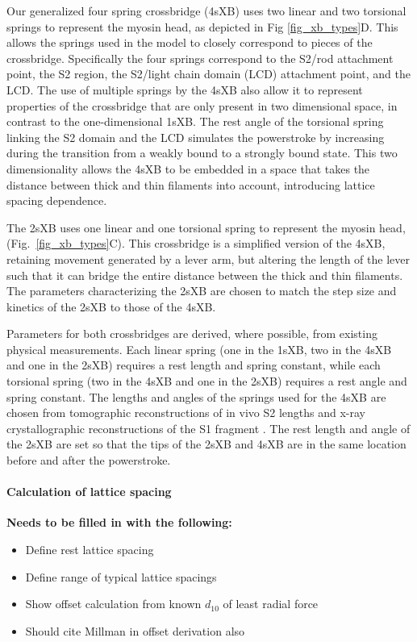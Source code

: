 \documentclass[]{article}
\begin{document}
Our generalized four spring crossbridge (4sXB) uses two linear and two torsional springs to represent the myosin head, as depicted in Fig \ref{fig_xb_types}D.
This allows the springs used in the model to closely correspond to pieces of the crossbridge.
Specifically the four springs correspond to the S2/rod attachment point, the S2 region, the S2/light chain domain (LCD) attachment point, and the LCD.
The use of multiple springs by the 4sXB also allow it to represent properties of the crossbridge that are only present in two dimensional space, in contrast to the one-dimensional 1sXB. 
The rest angle of the torsional spring linking the S2 domain and the LCD simulates the powerstroke by increasing during the transition from a weakly bound to a strongly bound state.
This two dimensionality allows the 4sXB to be embedded in a space that takes the distance between thick and thin filaments into account, introducing lattice spacing dependence.

The 2sXB uses one linear and one torsional spring to represent the myosin head, (Fig.~\ref{fig_xb_types}C).
This crossbridge is a simplified version of the 4sXB, retaining movement generated by a lever arm, but altering the length of the lever such that it can bridge the entire distance between the thick and thin filaments.
The parameters characterizing the 2sXB are chosen to match the step size and kinetics of the 2sXB to those of the 4sXB.

Parameters for both crossbridges are derived, where possible, from existing physical measurements.
Each linear spring (one in the 1sXB, two in the 4sXB and one in the 2sXB) requires a rest length and spring constant, while each torsional spring (two in the 4sXB and one in the 2sXB) requires a rest angle and spring constant.
The lengths and angles of the springs used for the 4sXB are chosen from tomographic reconstructions of in vivo S2 lengths and x-ray crystallographic reconstructions of the S1 fragment \citep{Taylor:1999p2569, Rayment:1993p1914}.
The rest length and angle of the 2sXB are set so that the tips of the 2sXB and 4sXB are in the same location before and after the powerstroke.



\paragraph{Calculation of lattice spacing} %
\textbf{Needs to be filled in with the following:}
\begin{itemize}
 \item Define rest lattice spacing
 \item Define range of typical lattice spacings
 \item Show offset calculation from known $d_{10}$ of least radial force
 \item Should cite Millman in offset derivation also
\end{itemize}
\end{document}
